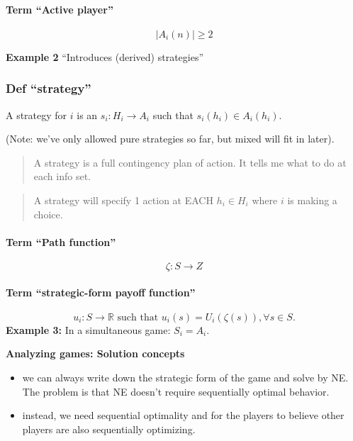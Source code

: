 \documentclass[
]{article}
\providecommand{\tightlist}{%
  \setlength{\itemsep}{0pt}\setlength{\parskip}{0pt}}
\begin{document}
\hypertarget{term-active-player}{%
\paragraph{Term ``Active player''}\label{term-active-player}}

\[|A_i(n)| \geq 2\]

\textbf{Example 2} ``Introduces (derived) strategies''

\hypertarget{def-strategy}{%
\subsubsection{Def ``strategy''}\label{def-strategy}}

A strategy for \(i\) is an \(s_i: H_i \rightarrow A_i\) such that
\(s_i(h_i) \in A_i(h_i)\).

(Note: we've only allowed pure strategies so far, but mixed will fit in
later).

\begin{quote}
A strategy is a full contingency plan of action. It tells me what to do
at each info set.
\end{quote}

\begin{quote}
A strategy will specify 1 action at EACH \(h_i \in H_i\) where \(i\) is
making a choice.
\end{quote}

\hypertarget{term-path-function}{%
\paragraph{Term ``Path function''}\label{term-path-function}}

\[\zeta: S \rightarrow Z\]

\hypertarget{term-strategic-form-payoff-function}{%
\paragraph{Term ``strategic-form payoff
function''}\label{term-strategic-form-payoff-function}}

\[u_i: S \rightarrow \mathbb{R} \text{ such that } u_i(s) = U_i(\zeta(s)),  \forall s\in S.\]
\textbf{Example 3:} In a simultaneous game: \(S_i = A_i\).

\textbf{Analyzing games: Solution concepts}

\begin{itemize}
\tightlist
\item
  we can always write down the strategic form of the game and solve by
  NE. The problem is that NE doesn't require sequentially optimal
  behavior.
\item
  instead, we need sequential optimality and for the players to believe
  other players are also sequentially optimizing.
\end{itemize}
\end{document}
